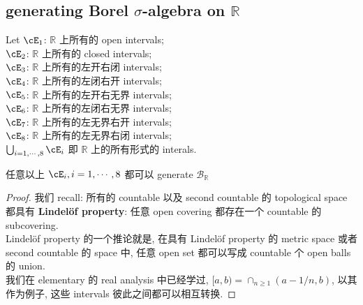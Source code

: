 \subsection{generating Borel $\sigma$-algebra on $\mathbb{R}$}
\begin{example}
    Let
    $\cE_1 $: $\mathbb{R}$ 上所有的 open intervals; \\ 
    $\cE_2 $: $\mathbb{R}$ 上所有的 closed intervals;\\
    $\cE_3 $: $\mathbb{R}$ 上所有的左开右闭 intervals;\\
    $\cE_4 $: $\mathbb{R}$ 上所有的左闭右开 intervals;\\
    $\cE_5 $: $\mathbb{R}$ 上所有的左开右无界 intervals;\\
    $\cE_6 $: $\mathbb{R}$ 上所有的左闭右无界 intervals;\\
    $\cE_7 $: $\mathbb{R}$ 上所有的左无界右开 intervals;\\
    $\cE_8 $: $\mathbb{R}$ 上所有的左无界右闭 intervals;\\
    $\bigcup_{i=1,\cdots,8}\cE_i$ 即 $\mathbb{R}$ 上的所有形式的 interals.
\begin{lemma}
    任意以上 $\cE_i, i=1,\cdots,8$ 都可以 generate $\mathcal{B}_{\mathbb{R}}$
\end{lemma}
\begin{proof}
    我们 recall: 所有的 countable 以及 second countable 的 topological space 都具有 \textbf{Lindelöf property}: 任意 open covering 都存在一个 countable 的 subcovering.\\
    Lindelöf property 的一个推论就是, 在具有 Lindelöf property 的 metric space 或者 second countable 的 space 中, 任意 open set 都可以写成 countable 个 open balls 的 union.\\
    我们在 elementary 的 real analysis 中已经学过, $[a,b) = \cap_{n \geq 1}(a-1/n, b)$, 以其作为例子, 这些 intervals 彼此之间都可以相互转换.
\end{proof}
\end{example}




